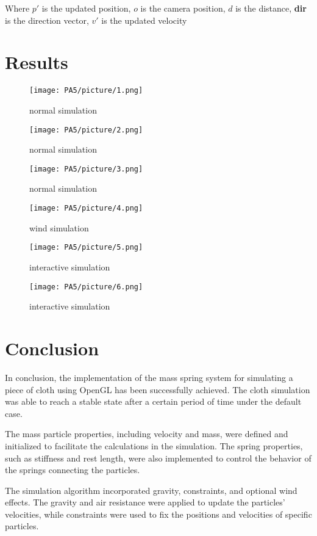 \documentclass[acmtog]{acmart}
\begin{document}
Where \(p'\) is the updated position, \(o\) is the camera position, \(d\) is the distance, \textbf{dir} is the direction vector, \(v'\) is the updated velocity

\section{Results}

\begin{figure}[H]
	\centering
	\texttt{[image: PA5/picture/1.png]}
	\caption{normal simulation}
\end{figure}
\begin{figure}[H]
	\centering
	\texttt{[image: PA5/picture/2.png]}
	\caption{normal simulation}
\end{figure}
\begin{figure}[H]
	\centering
	\texttt{[image: PA5/picture/3.png]}
	\caption{normal simulation}
\end{figure}
\begin{figure}[H]
	\centering
	\texttt{[image: PA5/picture/4.png]}
	\caption{wind simulation}
\end{figure}
\begin{figure}[H]
	\centering
	\texttt{[image: PA5/picture/5.png]}
	\caption{interactive simulation}
\end{figure}
\begin{figure}[H]
	\centering
	\texttt{[image: PA5/picture/6.png]}
	\caption{interactive simulation}
\end{figure}

\section{Conclusion}

In conclusion, the implementation of the mass spring system for simulating a piece of cloth using OpenGL has been successfully achieved. The cloth simulation was able to reach a stable state after a certain period of time under the default case.

The mass particle properties, including velocity and mass, were defined and initialized to facilitate the calculations in the simulation. The spring properties, such as stiffness and rest length, were also implemented to control the behavior of the springs connecting the particles.

The simulation algorithm incorporated gravity, constraints, and optional wind effects. The gravity and air resistance were applied to update the particles' velocities, while constraints were used to fix the positions and velocities of specific particles.
\end{document}
